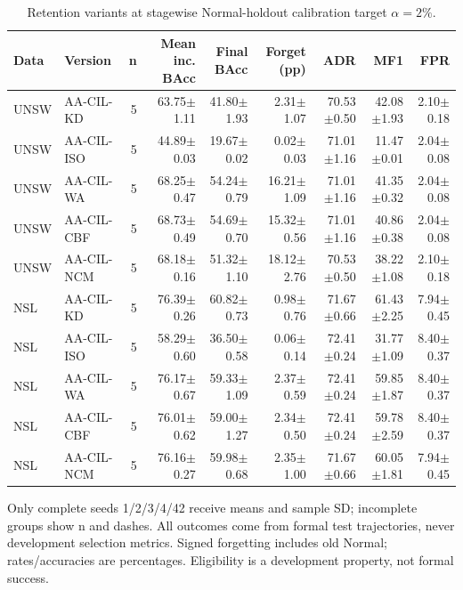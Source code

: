 \begin{table}[t]
\centering\scriptsize
\setlength{\tabcolsep}{3.8pt}
\caption{Retention variants at stagewise Normal-holdout calibration target $\alpha=2\%$.}\label{tab:retention-results}
\begin{tabular}{llrrrrrrr}
\toprule
Data & Version & n & Mean inc. BAcc & Final BAcc & Forget (pp) & ADR & MF1 & FPR \\
\midrule
UNSW & AA-CIL-KD & 5 & 63.75$\pm$1.11 & 41.80$\pm$1.93 & 2.31$\pm$1.07 & 70.53$\pm$0.50 & 42.08$\pm$1.93 & 2.10$\pm$0.18 \\
UNSW & AA-CIL-ISO & 5 & 44.89$\pm$0.03 & 19.67$\pm$0.02 & 0.02$\pm$0.03 & 71.01$\pm$1.16 & 11.47$\pm$0.01 & 2.04$\pm$0.08 \\
UNSW & AA-CIL-WA & 5 & 68.25$\pm$0.47 & 54.24$\pm$0.79 & 16.21$\pm$1.09 & 71.01$\pm$1.16 & 41.35$\pm$0.32 & 2.04$\pm$0.08 \\
UNSW & AA-CIL-CBF & 5 & 68.73$\pm$0.49 & 54.69$\pm$0.70 & 15.32$\pm$0.56 & 71.01$\pm$1.16 & 40.86$\pm$0.38 & 2.04$\pm$0.08 \\
UNSW & AA-CIL-NCM & 5 & 68.18$\pm$0.16 & 51.32$\pm$1.10 & 18.12$\pm$2.76 & 70.53$\pm$0.50 & 38.22$\pm$1.08 & 2.10$\pm$0.18 \\
NSL & AA-CIL-KD & 5 & 76.39$\pm$0.26 & 60.82$\pm$0.73 & 0.98$\pm$0.76 & 71.67$\pm$0.66 & 61.43$\pm$2.25 & 7.94$\pm$0.45 \\
NSL & AA-CIL-ISO & 5 & 58.29$\pm$0.60 & 36.50$\pm$0.58 & 0.06$\pm$0.14 & 72.41$\pm$0.24 & 31.77$\pm$1.09 & 8.40$\pm$0.37 \\
NSL & AA-CIL-WA & 5 & 76.17$\pm$0.67 & 59.33$\pm$1.09 & 2.37$\pm$0.59 & 72.41$\pm$0.24 & 59.85$\pm$1.87 & 8.40$\pm$0.37 \\
NSL & AA-CIL-CBF & 5 & 76.01$\pm$0.62 & 59.00$\pm$1.27 & 2.34$\pm$0.50 & 72.41$\pm$0.24 & 59.78$\pm$2.59 & 8.40$\pm$0.37 \\
NSL & AA-CIL-NCM & 5 & 76.16$\pm$0.27 & 59.98$\pm$0.68 & 2.35$\pm$1.00 & 71.67$\pm$0.66 & 60.05$\pm$1.81 & 7.94$\pm$0.45 \\
\bottomrule
\end{tabular}
\par\vspace{2pt}\begin{minipage}{.98\linewidth}\footnotesize Only complete seeds 1/2/3/4/42 receive means and sample SD; incomplete groups show n and dashes. All outcomes come from formal test trajectories, never development selection metrics. Signed forgetting includes old Normal; rates/accuracies are percentages. Eligibility is a development property, not formal success.\end{minipage}
\end{table}

